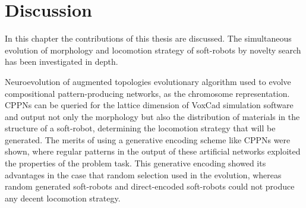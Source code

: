 

\chapter{Discussion} %

\label{Discussion} %


In this chapter the contributions of this thesis are discussed. The simultaneous evolution of morphology and locomotion strategy of soft-robots by novelty search has been investigated in depth. 

Neuroevolution of augmented topologies evolutionary algorithm used to evolve compositional pattern-producing networks, as the chromosome representation. CPPNs can be queried for the lattice dimension of VoxCad simulation software and output not only the morphology but also the distribution of materials in the structure of a soft-robot, determining the locomotion strategy that will be generated. The merits of using a generative encoding scheme like CPPNs were shown, where regular patterns in the output of these artificial networks exploited the properties of the problem task. This generative encoding showed its advantages in the case that random selection used in the evolution, whereas random generated soft-robots and direct-encoded soft-robots could not produce any decent locomotion strategy. 

